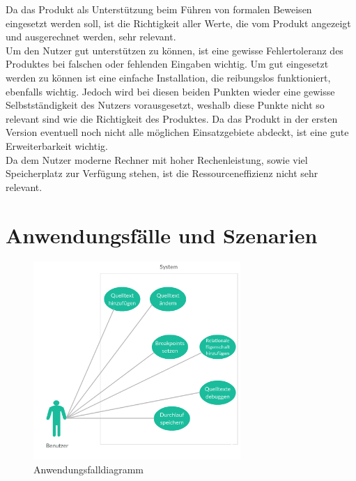 \documentclass[parskip=full]{scrartcl}
\begin{document}
Da das Produkt als Unterstützung beim Führen von formalen Beweisen eingesetzt werden soll, ist die Richtigkeit aller Werte, die vom Produkt angezeigt und ausgerechnet werden, sehr relevant. \\
Um den Nutzer gut unterstützen zu können, ist eine gewisse Fehlertoleranz des Produktes bei falschen oder fehlenden Eingaben wichtig. Um gut eingesetzt werden zu können ist eine einfache Installation, die reibungslos funktioniert, ebenfalls wichtig. Jedoch wird bei diesen beiden Punkten wieder eine gewisse Selbstständigkeit des Nutzers vorausgesetzt, weshalb diese Punkte nicht so relevant sind wie die Richtigkeit des Produktes.
Da das Produkt in der ersten Version eventuell noch nicht alle möglichen Einsatzgebiete abdeckt, ist eine gute Erweiterbarkeit wichtig. \\
Da dem Nutzer moderne Rechner mit hoher Rechenleistung, sowie viel Speicherplatz zur Verfügung stehen, ist die Ressourceneffizienz nicht sehr relevant. 
 

\newpage
\section{Anwendungsfälle und Szenarien}
\begin{figure}[h] 
  \centering
     \includegraphics[width=0.7\textwidth]{Anwendungsfalldiagramm}
  \caption{Anwendungsfalldiagramm}
  \label{fig:Bild1}
\end{figure}
\end{document}
